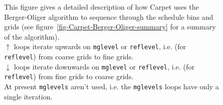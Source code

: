 \documentclass{article}
\def\thorn#1{\textbf{#1}}
\def\ie{i.e.\hbox{}}
\begin{document}
\begin{figure}[bp]
\begin{center}
{\begin{minipage}[c]{\textwidth}
%
 \end{minipage}
}
\end{center}
\caption[Detailed View of the \thorn{Carpet} Berger-Oliger Algorithm]
	{
	This figure gives a detailed description of how Carpet
		uses the Berger-Oliger algorithm
		to sequence through the schedule bins and grids
		(see figure~\protect\ref{fig-Carpet-Berger-Oliger-summary}
		 for a summary of the algorithm).			\\
	$\uparrow$ loops iterate upwards
		on \texttt{mglevel} or \texttt{reflevel},
		\ie{} (for \texttt{reflevel})
		from coarse grids to fine grids.			\\
	$\downarrow$ loops iterate downwards
		on \texttt{mglevel} or \texttt{reflevel},
		\ie{} (for \texttt{reflevel})
		from fine grids to coarse grids.			\\
	At present \texttt{mglevels} aren't used, \ie{} the
		\texttt{mglevels} loops have only a single iteration.	%
	}
\label{fig-Carpet-Berger-Oliger-details}
\end{figure}
\end{document}

